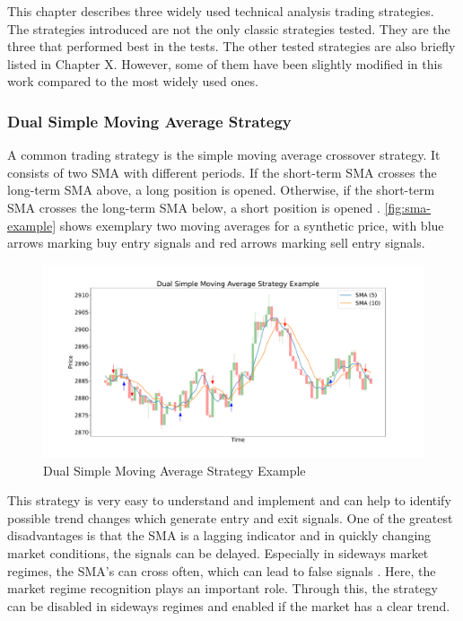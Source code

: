 This chapter describes three widely used technical analysis trading strategies.
The strategies introduced are not the only classic strategies tested.
They are the three that performed best in the tests.
The other tested strategies are also briefly listed in Chapter X. %
However, some of them have been slightly modified in this work compared to the most widely used ones.

\subsubsection{Dual Simple Moving Average Strategy}
\label{chap:sma2}

A common trading strategy is the simple moving average crossover strategy.
It consists of two SMA with different periods.
If the short-term SMA crosses the long-term SMA above, a long position is opened.
Otherwise, if the short-term SMA crosses the long-term SMA below, a short position is opened \cite{sma-strategy-basics}.
\autoref{fig:sma-example} shows exemplary two moving averages for a synthetic price, with blue arrows marking buy entry signals and red arrows marking sell entry signals.

\begin{figure}[H]
    \centering
    \includegraphics[width=\textwidth]{images/trading-strategies/sma-example}
    \caption{Dual Simple Moving Average Strategy Example}
    \label{fig:sma-example}
\end{figure}

This strategy is very easy to understand and implement and can help to identify possible trend changes which generate entry and exit signals.
One of the greatest disadvantages is that the SMA is a lagging indicator and in quickly changing market conditions, the signals can be delayed.
Especially in sideways market regimes, the SMA's can cross often, which can lead to false signals \cite{sma-advantage-disadvantage}.
Here, the market regime recognition plays an important role.
Through this, the strategy can be disabled in sideways regimes and enabled if the market has a clear trend.

